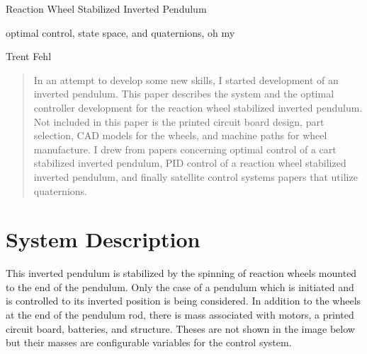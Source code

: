 \documentclass{article}
\begin{document}
\centerline{\sc \large Reaction Wheel Stabilized Inverted Pendulum}
\vspace{.25pc}
\centerline{\sc \small optimal control, state space, and quaternions, oh my}
\vspace{.5pc}
\centerline{\sc Trent Fehl}
\vspace{1pc}

\begin{abstract}
In an attempt to develop some new skills, I started development of an 
inverted pendulum. This paper describes the system and the optimal 
controller development for the reaction wheel stabilized inverted pendulum.
Not included in this paper is the printed circuit board design, part 
selection, CAD models for the wheels, and machine paths for wheel manufacture.
I drew from papers concerning optimal control of a cart stabilized inverted 
pendulum, PID control of a reaction wheel stabilized inverted pendulum, 
and finally satellite control systems papers that utilize quaternions.
\end{abstract}

\section*{System Description}
\noindent This inverted pendulum is stabilized by the spinning of reaction wheels
mounted to the end of the pendulum. Only the case of a pendulum which is 
initiated and is controlled to its inverted position is being considered.
In addition to the wheels at the end of the pendulum rod, there is mass
associated with motors, a printed circuit board, batteries, and structure.
Theses are not shown in the image below but their masses are configurable 
variables for the control system.
\end{document}
